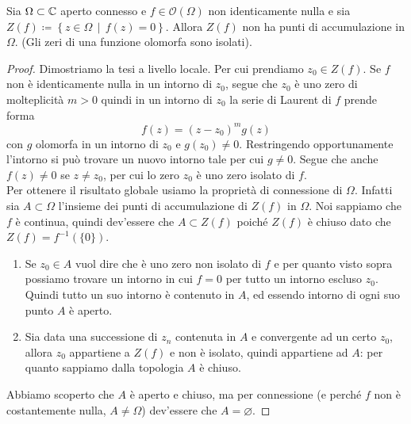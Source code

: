 \begin{theorem}
   \label{thr:zeri_di_funz_no_accum}
  Sia $\Omega \subset \mathbb{C}$ aperto connesso e $f\in \mathcal{O}(\Omega)$ non
  identicamente nulla e sia $Z(f) \coloneqq \left\{ z \in \Omega \,\middle|\,
  f(z) = 0 \right\}$. Allora  $Z(f)$ non ha punti di accumulazione in $\Omega$.
  (Gli zeri di una funzione olomorfa sono isolati).
\end{theorem}
\begin{proof}
    Dimostriamo la tesi a livello locale. Per cui prendiamo $z_0 \in Z(f)$. Se
    $f$ non è identicamente nulla in un intorno di $z_0$, segue che $z_0$ è uno
    zero di molteplicità $m > 0$ quindi in un intorno di $z_0$ la serie di
    Laurent di $f$ prende forma
    \begin{equation*}
      f(z) = (z-z_0)^m g(z)
    \end{equation*}
    con $g$ olomorfa in un intorno di $z_0$ e $g(z_0) \neq 0$.
    Restringendo opportunamente l'intorno si può trovare un nuovo intorno tale
    per cui $g \neq 0$. Segue che anche $f(z) \neq 0$ se $z \neq z_0$, per cui
    lo zero $z_0$ è uno zero isolato di $f$.\\

    Per ottenere il risultato globale usiamo la proprietà di connessione di
    $\Omega$. Infatti sia $A \subset \Omega$ l'insieme dei punti di
    accumulazione di $Z(f)$ in $\Omega$. Noi sappiamo che $f$ è continua, quindi
    dev'essere che $A \subset Z(f)$ poiché $Z(f)$ è chiuso dato che $Z(f) = f^{-1}(\{0\})$.
    \begin{enumerate}
    	\item Se $z_0 \in A$ vuol dire che è uno zero non isolato
    	di $f$ e per quanto visto sopra possiamo trovare un intorno in cui $f =
    	0$ per tutto un intorno escluso $z_0$. Quindi tutto un suo intorno è contenuto in $A$, ed essendo intorno di ogni suo punto $A$ è aperto.
    	\item Sia data una successione di $z_n$ contenuta in $A$ e convergente ad un certo $z_0$, allora $z_0$ appartiene a $Z(f)$ e non è isolato, quindi appartiene ad $A$: per quanto sappiamo dalla topologia $A$ è chiuso.
    \end{enumerate}
  Abbiamo scoperto che $A$ è aperto e chiuso, ma per connessione (e perché $f$ non è costantemente nulla, $A \neq \Omega$) dev'essere che $A = \varnothing$.
\end{proof}

